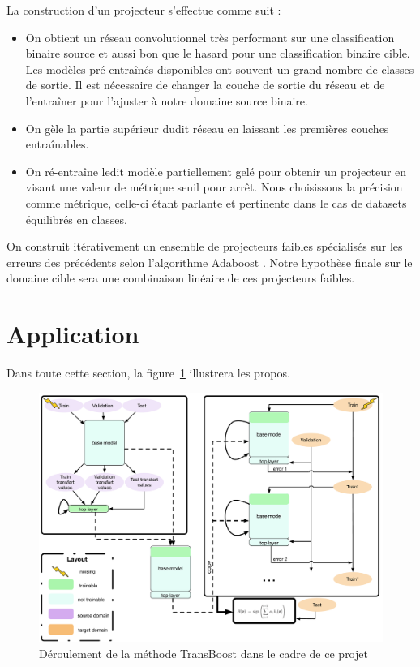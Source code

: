 \documentclass[11 pt]{article}
\begin{document}
\pagebreak

\begin{samepage}
La construction d'un projecteur s'effectue comme suit : \medskip
  \begin{itemize}
    \item On obtient un réseau convolutionnel très performant sur une classification binaire source et aussi bon que le hasard pour une classification binaire cible. Les modèles pré-entraînés disponibles ont souvent un grand nombre de classes de sortie. Il est nécessaire de changer la couche de sortie du réseau et de l’entraîner pour l’ajuster à notre domaine source binaire.
    \nopagebreak
    \item On gèle la partie supérieur dudit réseau en laissant les premières couches entraînables.
    \nopagebreak
    \item On ré-entraîne ledit modèle partiellement gelé pour obtenir un projecteur en visant une valeur de métrique seuil pour arrêt. Nous choisissons la précision comme métrique, celle-ci étant parlante et pertinente dans le cas de datasets équilibrés en classes.
  \end{itemize}
\end{samepage}

On construit itérativement un ensemble de projecteurs faibles spécialisés sur les erreurs des précédents selon l'algorithme Adaboost \cite{boosting}. Notre hypothèse finale sur le domaine cible sera une combinaison linéaire de ces projecteurs faibles.

\section{Application}

Dans toute cette section, la figure~\ref{figRes} illustrera les propos.

\begin{figure}[H]
  \includegraphics[width=\textwidth]{fig1.pdf}
  \caption{Déroulement de la méthode TransBoost dans le cadre de ce projet}
  \label{figRes}
\end{figure}
\end{document}

